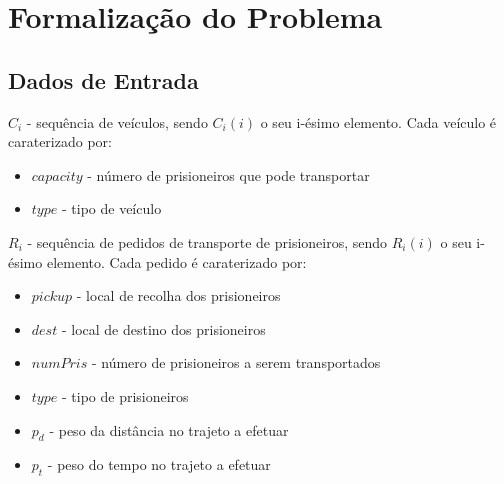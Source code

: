 \documentclass[article, a4paper, 12pt, oneside]{memoir}
\begin{document}
\newpage

\chapter[Formalização do Problema][Formalização do Problema]{Formalização do Problema} \label{\thechapter}

\section{Dados de Entrada}

$C_i$ - sequência de veículos, sendo $C_i(i)$ o seu i-ésimo elemento. Cada veículo é caraterizado por:
\begin{itemize}
	\item $capacity$ - número de prisioneiros que pode transportar
	\item $type$ - tipo de veículo
\end{itemize}

$R_i$ - sequência de pedidos de transporte de prisioneiros, sendo $R_i(i)$ o seu i-ésimo elemento. Cada pedido é caraterizado por:
\begin{itemize}
	\item $pickup$ - local de recolha dos prisioneiros
	\item $dest$ - local de destino dos prisioneiros
	\item $numPris$ - número de prisioneiros a serem transportados
	\item $type$ - tipo de prisioneiros
	\item $p_d$ - peso da distância no trajeto a efetuar
	\item $p_t$ - peso do tempo no trajeto a efetuar
\end{itemize}
\end{document}
